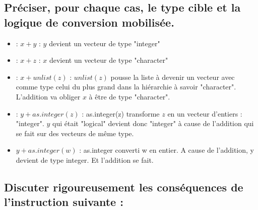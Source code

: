 \documentclass[
  11pt,
]{article}
\begin{document}
\subsection{Préciser, pour chaque cas, le type cible et la logique de
conversion
mobilisée.}\label{pruxe9ciser-pour-chaque-cas-le-type-cible-et-la-logique-de-conversion-mobilisuxe9e.}

\begin{itemize}
\item : $x+y$ : $y$ devient un vecteur de type "integer"
\item : $x+z$ : $x$ devient un vecteur de type "character"
\item : $x+unlist(z)$ : $unlist(z)$ pousse la liste à devenir un vecteur avec comme type celui du plus grand dans la hiérarchie à savoir "character". L'addition va obliger $x$ à être de type "character". 
\item : $y+as.integer(z)$ : as.integer(z) transforme $z$ en un vecteur d'entiers : "integer". $y$ qui était "logical" devient donc "integer" à cause de l'addition qui se fait sur des vecteurs de même type.
\item $y+as.integer(w)$ : as.integer converti w en entier. A cause de l'addition, y devient de type integer. Et l'addition se fait.
\end{itemize}

\subsection{Discuter rigoureusement les conséquences de l'instruction
suivante
:}\label{discuter-rigoureusement-les-consuxe9quences-de-linstruction-suivante}
\end{document}
